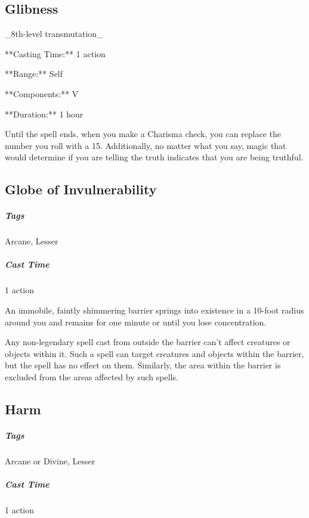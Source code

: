 

\subsection{Glibness}

_8th-level transmutation_

**Casting Time:** 1 action

**Range:** Self

**Components:** V

**Duration:** 1 hour

Until the spell ends, when you make a Charisma check, you can replace the number you roll with a 15. Additionally, no matter what you say, magic that would determine if you are telling the truth indicates that you are being truthful.

\subsection{Globe of Invulnerability}
\subparagraph*{Tags} Arcane, Lesser
\subparagraph*{Cast Time} 1 action

An immobile, faintly shimmering barrier springs into existence in a 10-foot radius around you and remains for one minute or until you lose concentration.

Any non-legendary spell cast from outside the barrier can’t affect creatures or objects within it. Such a spell can target creatures and objects within the barrier, but the spell has no effect on them. Similarly, the area within the barrier is excluded from the areas affected by such spells.

\subsection{Harm}
\subparagraph*{Tags} Arcane or Divine, Lesser
\subparagraph*{Cast Time} 1 action

